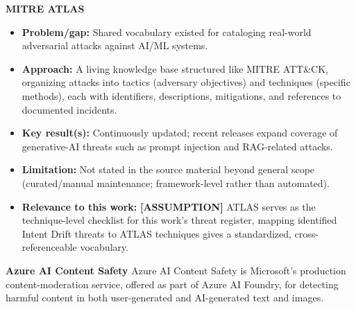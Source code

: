 \documentclass[a4paper,12pt]{report}
\begin{document}
\vspace{0.5em}
\textbf{MITRE ATLAS}
\begin{itemize}
    \item \textbf{Problem/gap:} Shared vocabulary existed for cataloging real-world adversarial attacks against AI/ML systems.
    
    \item \textbf{Approach:} A living knowledge base structured like MITRE ATT\&CK, organizing attacks into tactics (adversary objectives) and techniques 
    (specific methods), each with identifiers, descriptions, mitigations, and references to documented incidents.
    
    \item \textbf{Key result(s):} Continuously updated; recent releases expand coverage of generative-AI threats such as prompt injection and RAG-related attacks.
    
    \item \textbf{Limitation:} Not stated in the source material beyond general scope (curated/manual maintenance; framework-level rather than automated).    
    \item \textbf{Relevance to this work:} \textbf{[ASSUMPTION]} ATLAS serves as the technique-level checklist for this work's threat register, mapping 
    identified Intent Drift threats to ATLAS techniques gives a standardized, cross-referenceable vocabulary.
\end{itemize}

\textbf{Azure AI Content Safety}
Azure AI Content Safety is Microsoft's production content-moderation service, offered as 
part of Azure AI Foundry, for detecting harmful content in both user-generated and 
AI-generated text and images.
\end{document}

